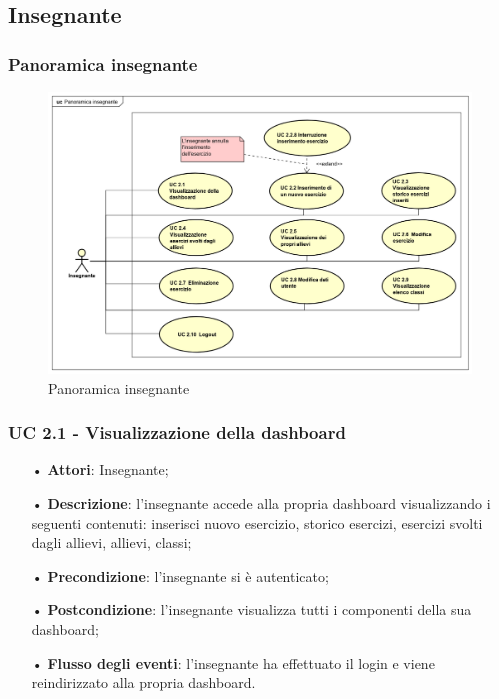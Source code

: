 \subsection{Insegnante}
\subsubsection{Panoramica insegnante}
\begin{figure}[H]
\centering
\includegraphics[width=17cm, keepaspectratio]{img/PanoramicaInsegnanti.png} 
\caption{Panoramica insegnante}
\end{figure}

\subsubsection{UC 2.1 - Visualizzazione della dashboard}
\begin{itemize}
	\item[•] \textbf{Attori}: Insegnante;
	\item[•] \textbf{Descrizione}: l'insegnante accede alla propria dashboard visualizzando i seguenti contenuti: inserisci nuovo esercizio, storico esercizi, esercizi svolti dagli allievi, allievi, classi;
	\item[•] \textbf{Precondizione}: l'insegnante si è autenticato;
	\item[•] \textbf{Postcondizione}: l'insegnante visualizza tutti i componenti della sua dashboard;
	\item[•] \textbf{Flusso degli eventi}: l’insegnante ha effettuato il login e viene reindirizzato alla propria dashboard.
\end{itemize}


